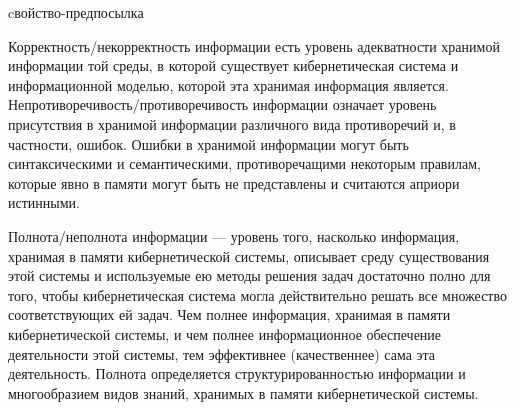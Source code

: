 \begin{SCn}
\begin{scnrelfromlist}{cвойство-предпосылка}
\end{scnrelfromlist}
\end{SCn}

Корректность/некорректность информации есть уровень адекватности хранимой информации той среды, в которой существует кибернетическая система и информационной моделью, которой эта хранимая информация является. 
Непротиворечивость/противоречивость информации означает уровень присутствия в хранимой информации различного вида противоречий и, в частности, ошибок. 
Ошибки в хранимой информации могут быть синтаксическими и семантическими, противоречащими некоторым правилам, которые явно в памяти могут быть не представлены и считаются априори истинными.

Полнота/неполнота информации --- уровень того, насколько информация, хранимая в памяти кибернетической системы, описывает среду существования этой системы и используемые ею методы решения задач достаточно полно для того, чтобы кибернетическая система могла действительно решать все множество соответствующих ей задач. 
Чем полнее информация, хранимая в памяти кибернетической системы, и чем полнее информационное обеспечение деятельности этой системы, тем эффективнее (качественнее) сама эта деятельность. 
Полнота определяется структурированностью информации и многообразием видов знаний, хранимых в памяти кибернетической системы.


